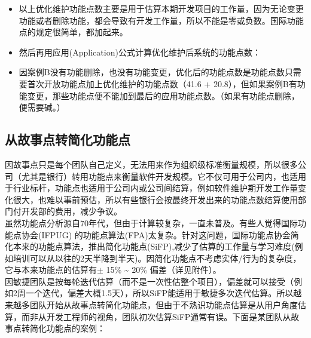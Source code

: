 \documentclass{book}        %
\providecommand{\tightlist}{%
  \setlength{\itemsep}{0pt}\setlength{\parskip}{0pt}}
\begin{document}
\begin{itemize}
\tightlist
\item
  以上优化维护功能点数主要是用于估算本期开发项目的工作量，因为无论变更功能或者删除功能，都会导致有开发工作量，所以不能是零或负数。国际功能点的规定很简单，都加起来。\\
\item
  然后再用应用(Application)公式计算优化维护后系统的功能点数：
\end{itemize}

\begin{description}
\item[]
\end{description}

\begin{itemize}
\tightlist
\item
  因案例B没有功能删除，也没有功能变更，优化后的功能点数是功能点数只需要首次开放功能点加上优化维护的功能点数（41.6
  +
  20.8），但如果案例B有功能变更，那些功能点便不能加到最后的应用功能点数。（如果有功能点删除，便需要碱。）
\end{itemize}

\hypertarget{ux4eceux6545ux4e8bux70b9ux8f6cux7b80ux5316ux529fux80fdux70b9}{%
\subsection{从故事点转简化功能点}\label{ux4eceux6545ux4e8bux70b9ux8f6cux7b80ux5316ux529fux80fdux70b9}}

因故事点只是每个团队自己定义，无法用来作为组织级标准衡量规模，所以很多公司（尤其是银行）转用功能点来衡量软件开发规模。它不仅可用于公司内，也适用于行业标杆，功能点也适用于公司内或公司间结算，例如软件维护期开发工作量变化很大，也难以事前预估，所以有些银行会按最终开发出来的功能点数结算使用部门付开发部的费用，减少争议。\\
虽然功能点分析源自70年代，但由于计算较复杂，一直未普及。有些人觉得国际功能点协会(IFPUG)
的功能点算法(FPA)太复杂。针对这问题，国际功能点协会简化本来的功能点算法，推出简化功能点(SiFP),减少了估算的工作量与学习难度(例如培训可以从以往的2天半降到半天)。因简化功能点不考虑实体/行为的复杂度，它与本来功能点的估算有\(\pm\)
15\% \textasciitilde{} 20\% 偏差（详见附件）。\\
因敏捷团队是按每轮迭代估算（而不是一次性估整个项目），偏差就可以接受（例如2周一个迭代，偏差大概1.5天），所以SiFP能适用于敏捷多次迭代估算。所以越来越多团队开始从故事点转简化功能点，但由于不熟识功能点估算是从用户角度估算，而非从开发工程师的视角，团队初次估算SiFP通常有误。下面是某团队从故事点转简化功能点的案例：
\end{document}
